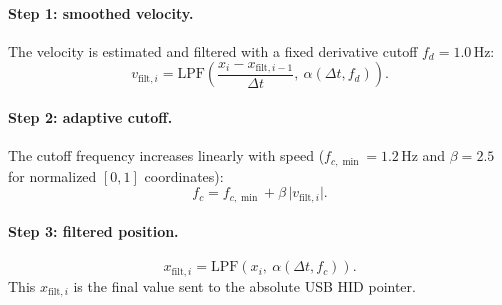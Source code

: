 \documentclass[11pt,a4paper]{article}
\begin{document}
\paragraph{Step 1: smoothed velocity.} The velocity is estimated and filtered
with a fixed derivative cutoff $f_d = 1.0$\,Hz:
\begin{equation}
  v_{\text{filt},i} = \mathrm{LPF}\!\left(
    \frac{x_i - x_{\text{filt},i-1}}{\Delta t},\ \alpha(\Delta t, f_d)\right).
\end{equation}

\paragraph{Step 2: adaptive cutoff.} The cutoff frequency increases linearly
with speed ($f_{c,\min} = 1.2$\,Hz and $\beta = 2.5$ for normalized $[0,1]$
coordinates):
\begin{equation}
  f_c = f_{c,\min} + \beta\,\lvert v_{\text{filt},i}\rvert .
\end{equation}

\paragraph{Step 3: filtered position.}
\begin{equation}
  x_{\text{filt},i} = \mathrm{LPF}\!\left(x_i,\ \alpha(\Delta t, f_c)\right).
\end{equation}
This $x_{\text{filt},i}$ is the final value sent to the absolute USB HID
pointer.
\end{document}
